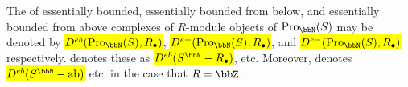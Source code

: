 \begin{definition}
\begin{enumerate}
    The  of essentially bounded, essentially bounded from below, and essentially bounded from above complexes of $R$-module objects of $\mathrm{Pro}_{\bbN}(S)$ may be denoted by \hl{$D^{eb}(\mathrm{Pro}_{\bbN}(S), R_\bullet)$}, \hl{$D^{e+}(\mathrm{Pro}_{\bbN}(S), R_\bullet)$}, and \hl{$D^{e-}(\mathrm{Pro}_{\bbN}(S), R_\bullet)$} respectively. \cite{ekedahl_af} denotes these as \hl{$D^{eb}(S^\bbN-R_\bullet)$}, etc. Moreover, \cite{ekedahl_af} denotes \hl{$D^{eb}(S^\bbN-\text{ab})$} etc. in the case that $R = \bbZ$. 
   \end{enumerate}
\end{definition}